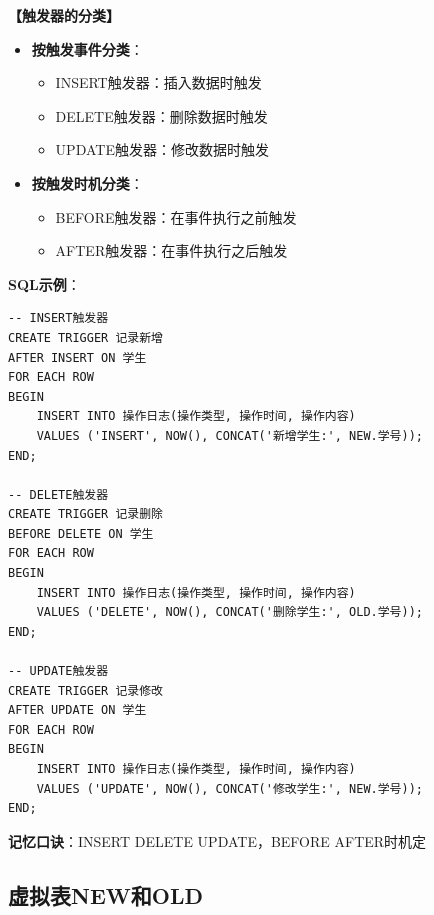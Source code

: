 \documentclass[12pt, a4paper]{article}
\newenvironment{bluebox}[1]{%
  \begin{trivlist}
  \item[\hskip\labelsep \textbf{#1}]
  \setlength{\parskip}{0.5ex}
  \setlength{\itemsep}{0.5ex}
}{%
  \end{trivlist}
  }
\begin{document}
\begin{bluebox}{触发器类型}
	\textbf{【触发器的分类】}

	\begin{itemize}[leftmargin=*, nosep]
		\item \textbf{按触发事件分类}：
		      \begin{itemize}[nosep]
			      \item INSERT触发器：插入数据时触发
			      \item DELETE触发器：删除数据时触发
			      \item UPDATE触发器：修改数据时触发
		      \end{itemize}

		\item \textbf{按触发时机分类}：
		      \begin{itemize}[nosep]
			      \item BEFORE触发器：在事件执行之前触发
			      \item AFTER触发器：在事件执行之后触发
		      \end{itemize}
	\end{itemize}

	\textbf{SQL示例}：
	\begin{verbatim}
-- INSERT触发器
CREATE TRIGGER 记录新增
AFTER INSERT ON 学生
FOR EACH ROW
BEGIN
    INSERT INTO 操作日志(操作类型, 操作时间, 操作内容)
    VALUES ('INSERT', NOW(), CONCAT('新增学生:', NEW.学号));
END;

-- DELETE触发器
CREATE TRIGGER 记录删除
BEFORE DELETE ON 学生
FOR EACH ROW
BEGIN
    INSERT INTO 操作日志(操作类型, 操作时间, 操作内容)
    VALUES ('DELETE', NOW(), CONCAT('删除学生:', OLD.学号));
END;

-- UPDATE触发器
CREATE TRIGGER 记录修改
AFTER UPDATE ON 学生
FOR EACH ROW
BEGIN
    INSERT INTO 操作日志(操作类型, 操作时间, 操作内容)
    VALUES ('UPDATE', NOW(), CONCAT('修改学生:', NEW.学号));
END;
	\end{verbatim}

	\textbf{记忆口诀}：INSERT DELETE UPDATE，BEFORE AFTER时机定
\end{bluebox}

\subsection{虚拟表NEW和OLD}
\end{document}
